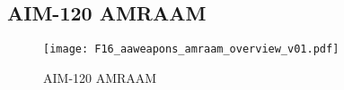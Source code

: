 \subsection{AIM-120 AMRAAM}
\label{subsec:aim120}
\begin{figure}[htbp]
    \centering
    \texttt{[image: F16\_aaweapons\_amraam\_overview\_v01.pdf]}
    \caption{AIM-120 AMRAAM}
\end{figure}

